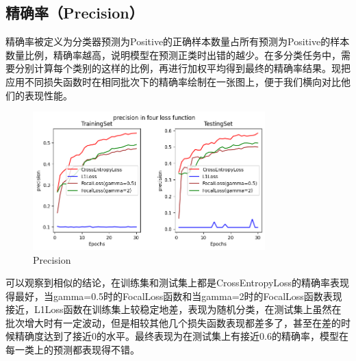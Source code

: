 \documentclass{article}
\begin{document}
\subsection{精确率（Precision）}
精确率被定义为分类器预测为Positive的正确样本数量占所有预测为Positive的样本数量比例，精确率越高，说明模型在预测正类时出错的越少。在多分类任务中，需要分别计算每个类别的这样的比例，再进行加权平均得到最终的精确率结果。现把应用不同损失函数时在相同批次下的精确率绘制在一张图上，便于我们横向对比他们的表现性能。
\begin{figure}[H]
    \centering
    \includegraphics[width=0.8\textwidth]{Figure/Precision.png}
    \caption{Precision}
    \label{fig:Precision}
\end{figure}
可以观察到相似的结论，在训练集和测试集上都是CrossEntropyLoss的精确率表现得最好，当gamma=0.5时的FocalLoss函数和当gamma=2时的FocalLoss函数表现接近，L1Loss函数在训练集上较稳定地差，表现为随机分类，在测试集上虽然在批次增大时有一定波动，但是相较其他几个损失函数表现都差多了，甚至在差的时候精确度达到了接近0的水平。最终表现为在测试集上有接近0.6的精确率，模型在每一类上的预测都表现得不错。
\end{document}
